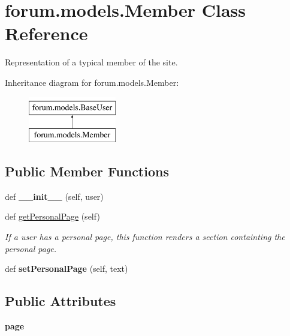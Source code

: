\hypertarget{classforum_1_1models_1_1_member}{}\section{forum.\+models.\+Member Class Reference}
\label{classforum_1_1models_1_1_member}


Representation of a typical member of the site.  


Inheritance diagram for forum.\+models.\+Member\+:\begin{figure}[H]
\begin{center}
\leavevmode
\includegraphics[height=2.000000cm]{classforum_1_1models_1_1_member}
\end{center}
\end{figure}
\subsection*{Public Member Functions}
\begin{DoxyCompactItemize}
\item 
\mbox{\label{classforum_1_1models_1_1_member_adde9a9c4eede5814f57a26e3d1c1d96c}} 
def {\bfseries \+\_\+\+\_\+init\+\_\+\+\_\+} (self, user)
\item 
def \mbox{\hyperlink{classforum_1_1models_1_1_member_ad7b529a832888707060ec31fd05a0809}{get\+Personal\+Page}} (self)
\begin{DoxyCompactList}\small\item\em If a user has a personal page, this function renders a section containting the personal page. \end{DoxyCompactList}\item 
\mbox{\label{classforum_1_1models_1_1_member_a4ab90d2a1744b6056dfbdf345cd11f30}} 
def {\bfseries set\+Personal\+Page} (self, text)
\end{DoxyCompactItemize}
\subsection*{Public Attributes}
\begin{DoxyCompactItemize}
\item 
\mbox{\label{classforum_1_1models_1_1_member_a6999fd808b0d3014a5bbddd0680a0d44}} 
{\bfseries page}
\end{DoxyCompactItemize}


